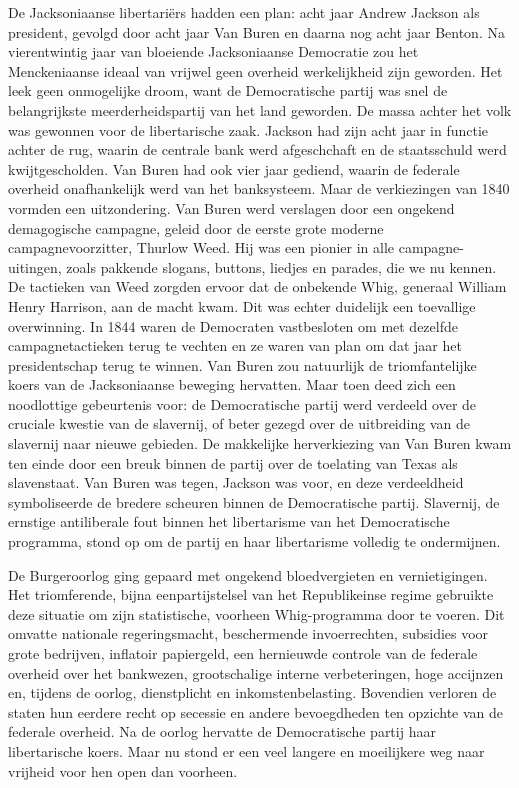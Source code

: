 \documentclass[
  a5paper,
  smalldemyvopaper,10pt,twoside,onecolumn,openright,extrafontsizes,hidelinks]{memoir}
\begin{document}
De Jacksoniaanse libertariërs hadden een plan: acht jaar Andrew Jackson
als president, gevolgd door acht jaar Van Buren en daarna nog acht jaar
Benton. Na vierentwintig jaar van bloeiende Jacksoniaanse Democratie zou
het Menckeniaanse ideaal van vrijwel geen overheid werkelijkheid zijn
geworden. Het leek geen onmogelijke droom, want de Democratische partij
was snel de belangrijkste meerderheidspartij van het land geworden. De
massa achter het volk was gewonnen voor de libertarische zaak. Jackson
had zijn acht jaar in functie achter de rug, waarin de centrale bank
werd afgeschchaft en de staatsschuld werd kwijtgescholden. Van Buren had
ook vier jaar gediend, waarin de federale overheid onafhankelijk werd
van het banksysteem. Maar de verkiezingen van 1840 vormden een
uitzondering. Van Buren werd verslagen door een ongekend demagogische
campagne, geleid door de eerste grote moderne campagnevoorzitter,
Thurlow Weed. Hij was een pionier in alle campagne-uitingen, zoals
pakkende slogans, buttons, liedjes en parades, die we nu kennen. De
tactieken van Weed zorgden ervoor dat de onbekende Whig, generaal
William Henry Harrison, aan de macht kwam. Dit was echter duidelijk een
toevallige overwinning. In 1844 waren de Democraten vastbesloten om met
dezelfde campagnetactieken terug te vechten en ze waren van plan om dat
jaar het presidentschap terug te winnen. Van Buren zou natuurlijk de
triomfantelijke koers van de Jacksoniaanse beweging hervatten. Maar toen
deed zich een noodlottige gebeurtenis voor: de Democratische partij werd
verdeeld over de cruciale kwestie van de slavernij, of beter gezegd over
de uitbreiding van de slavernij naar nieuwe gebieden. De makkelijke
herverkiezing van Van Buren kwam ten einde door een breuk binnen de
partij over de toelating van Texas als slavenstaat. Van Buren was tegen,
Jackson was voor, en deze verdeeldheid symboliseerde de bredere scheuren
binnen de Democratische partij. Slavernij, de ernstige antiliberale fout
binnen het libertarisme van het Democratische programma, stond op om de
partij en haar libertarisme volledig te ondermijnen.

De Burgeroorlog ging gepaard met ongekend bloedvergieten en
vernietigingen. Het triomferende, bijna eenpartijstelsel van het
Republikeinse regime gebruikte deze situatie om zijn statistische,
voorheen Whig-programma door te voeren. Dit omvatte nationale
regeringsmacht, beschermende invoerrechten, subsidies voor grote
bedrijven, inflatoir papiergeld, een hernieuwde controle van de federale
overheid over het bankwezen, grootschalige interne verbeteringen, hoge
accijnzen en, tijdens de oorlog, dienstplicht en inkomstenbelasting.
Bovendien verloren de staten hun eerdere recht op secessie en andere
bevoegdheden ten opzichte van de federale overheid. Na de oorlog
hervatte de Democratische partij haar libertarische koers. Maar nu stond
er een veel langere en moeilijkere weg naar vrijheid voor hen open dan
voorheen.
\end{document}
